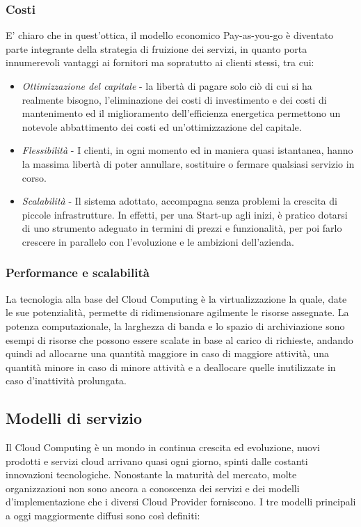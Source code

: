 \subsubsection{Costi}
E' chiaro che in quest'ottica, il modello economico Pay-as-you-go è diventato parte integrante della strategia di fruizione dei servizi, in quanto porta innumerevoli vantaggi ai fornitori ma sopratutto ai clienti stessi, tra cui:
    \begin{itemize}
    \item \textit{Ottimizzazione del capitale} - la libertà di pagare solo ciò di cui si ha realmente bisogno, l'eliminazione dei costi di investimento e dei costi di mantenimento ed il miglioramento dell'efficienza energetica permettono un notevole abbattimento dei costi ed un'ottimizzazione del capitale.
    \item \textit{Flessibilità} - I clienti, in ogni momento ed in maniera quasi istantanea, hanno la massima libertà di poter annullare, sostituire o fermare qualsiasi servizio in corso.
    \item \textit{Scalabilità} - Il sistema adottato, accompagna senza problemi la crescita di piccole infrastrutture. In effetti, per una Start-up agli inizi, è pratico dotarsi di uno strumento adeguato in termini di prezzi e funzionalità, per poi farlo crescere in parallelo con l'evoluzione e le ambizioni dell'azienda.
    \end{itemize}

\subsubsection{Performance e scalabilità}
La tecnologia alla base del Cloud Computing è la virtualizzazione la quale, date le sue potenzialità, permette di ridimensionare agilmente le risorse assegnate. La potenza computazionale, la larghezza di banda e lo spazio di archiviazione sono esempi di risorse che possono essere scalate in base al carico di richieste, andando quindi ad allocarne una quantità maggiore in caso di maggiore attività, una quantità minore in caso di minore attività e a deallocare quelle inutilizzate in caso d'inattività prolungata.

\subsection{Modelli di servizio}
Il Cloud Computing è un mondo in continua crescita ed evoluzione, nuovi prodotti e servizi cloud arrivano quasi ogni giorno, spinti dalle costanti innovazioni tecnologiche.
Nonostante la maturità del mercato, molte organizzazioni non sono ancora a conoscenza dei servizi e dei modelli d'implementazione che i diversi Cloud Provider forniscono.
I tre modelli principali a oggi maggiormente diffusi sono così definiti:

